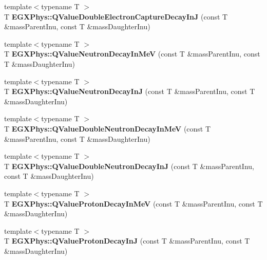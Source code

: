 \begin{DoxyCompactItemize}
{\footnotesize template$<$typename T $>$ }\\T {\bfseries E\+G\+X\+Phys\+::\+Q\+Value\+Double\+Electron\+Capture\+Decay\+InJ} (const T \&mass\+Parent\+Inu, const T \&mass\+Daughter\+Inu)
\item 
\mbox{\label{group___e_g_x_phys-_q_value_gaf854b3ac07909a87f44be4e38ebb0c32}} 
{\footnotesize template$<$typename T $>$ }\\T {\bfseries E\+G\+X\+Phys\+::\+Q\+Value\+Neutron\+Decay\+In\+MeV} (const T \&mass\+Parent\+Inu, const T \&mass\+Daughter\+Inu)
\item 
\mbox{\label{group___e_g_x_phys-_q_value_gab9ffbd12c3f814e03f0ed1fbdcba0700}} 
{\footnotesize template$<$typename T $>$ }\\T {\bfseries E\+G\+X\+Phys\+::\+Q\+Value\+Neutron\+Decay\+InJ} (const T \&mass\+Parent\+Inu, const T \&mass\+Daughter\+Inu)
\item 
\mbox{\label{group___e_g_x_phys-_q_value_ga6bfea723aca78b32ea67cc1ca7b4031b}} 
{\footnotesize template$<$typename T $>$ }\\T {\bfseries E\+G\+X\+Phys\+::\+Q\+Value\+Double\+Neutron\+Decay\+In\+MeV} (const T \&mass\+Parent\+Inu, const T \&mass\+Daughter\+Inu)
\item 
\mbox{\label{group___e_g_x_phys-_q_value_gada1ace2aa0a791df382f120767a56fe9}} 
{\footnotesize template$<$typename T $>$ }\\T {\bfseries E\+G\+X\+Phys\+::\+Q\+Value\+Double\+Neutron\+Decay\+InJ} (const T \&mass\+Parent\+Inu, const T \&mass\+Daughter\+Inu)
\item 
\mbox{\label{group___e_g_x_phys-_q_value_ga514354518df3bf1cde561b6d75879ef0}} 
{\footnotesize template$<$typename T $>$ }\\T {\bfseries E\+G\+X\+Phys\+::\+Q\+Value\+Proton\+Decay\+In\+MeV} (const T \&mass\+Parent\+Inu, const T \&mass\+Daughter\+Inu)
\item 
\mbox{\label{group___e_g_x_phys-_q_value_gaa344322393356bd442d17c992628218a}} 
{\footnotesize template$<$typename T $>$ }\\T {\bfseries E\+G\+X\+Phys\+::\+Q\+Value\+Proton\+Decay\+InJ} (const T \&mass\+Parent\+Inu, const T \&mass\+Daughter\+Inu)

\end{DoxyCompactItemize}
